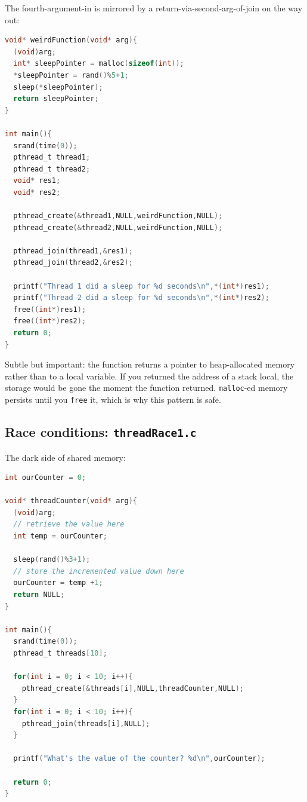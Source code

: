 \documentclass[11pt]{article}
\begin{document}
The fourth-argument-in is mirrored by a return-via-second-arg-of-join
on the way out:

\begin{lstlisting}[language=C]
void* weirdFunction(void* arg){
  (void)arg;
  int* sleepPointer = malloc(sizeof(int));
  *sleepPointer = rand()%5+1;
  sleep(*sleepPointer);
  return sleepPointer;
}

int main(){
  srand(time(0));
  pthread_t thread1;
  pthread_t thread2;
  void* res1;
  void* res2;

  pthread_create(&thread1,NULL,weirdFunction,NULL);
  pthread_create(&thread2,NULL,weirdFunction,NULL);

  pthread_join(thread1,&res1);
  pthread_join(thread2,&res2);

  printf("Thread 1 did a sleep for %d seconds\n",*(int*)res1);
  printf("Thread 2 did a sleep for %d seconds\n",*(int*)res2);
  free((int*)res1);
  free((int*)res2);
  return 0;
}
\end{lstlisting}

Subtle but important: the function returns a pointer to
heap-allocated memory rather than to a local variable. If you
returned the address of a stack local, the storage would be gone the
moment the function returned. \texttt{malloc}-ed memory persists
until you \texttt{free} it, which is why this pattern is safe.

\subsection*{Race conditions: \texttt{threadRace1.c}}

The dark side of shared memory:

\begin{lstlisting}[language=C]
int ourCounter = 0;

void* threadCounter(void* arg){
  (void)arg;
  // retrieve the value here
  int temp = ourCounter;

  sleep(rand()%3+1);
  // store the incremented value down here
  ourCounter = temp +1;
  return NULL;
}

int main(){
  srand(time(0));
  pthread_t threads[10];

  for(int i = 0; i < 10; i++){
    pthread_create(&threads[i],NULL,threadCounter,NULL);
  }
  for(int i = 0; i < 10; i++){
    pthread_join(threads[i],NULL);
  }

  printf("What's the value of the counter? %d\n",ourCounter);

  return 0;
}
\end{lstlisting}
\end{document}
